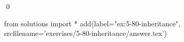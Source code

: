 
\begin{ex}
  \label{ex:5-80-inheritance}
  
  \qed
\end{ex}
\begin{python0}
from solutions import *
add(label="ex:5-80-inheritance",
    srcfilename='exercises/5-80-inheritance/answer.tex')
\end{python0}
